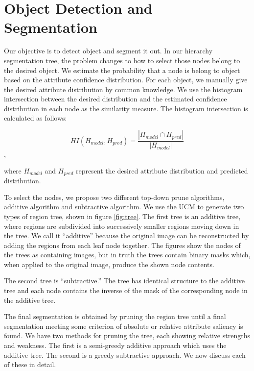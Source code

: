 \documentclass[10pt,twocolumn,letterpaper]{article}
\begin{document}
\section{Object Detection and Segmentation}
\label{sec:detection}

Our objective is to detect object and segment it out. In our
hierarchy segmentation tree, the problem changes to how to select
those nodes belong to the desired object. We estimate the
probability that a node is belong to object based on the attribute
confidence distribution. For each object, we manually give the
desired attribute distribution by common knowledge. We use the
histogram intersection between the desired distribution and the
estimated confidence distribution in each node as the similarity
measure. The histogram intersection is calculated as follows:

\[ HI(H_{model},H_{pred}) = \frac{|H_{model} \cap H_{pred}|}{|H_{model}|}
\] ,

where $H_{model}$ and $H_{pred}$ represent the desired attribute
distribution and predicted distribution.

To select the nodes, we propose two different top-down prune algorithms, additive algorithm and subtractive algorithm. We use the UCM to generate two types of region tree, shown in figure \ref{fig:tree}.
The first tree is an additive tree, where regions are subdivided into successively
smaller regions moving down in the tree.  We call it ``additive'' because the
original image can be reconstructed by adding the regions from each leaf node
together.  The figures show the nodes of the trees as containing images, but in
truth the trees contain binary masks which, when applied to the original image,
produce the shown node contents.

The second tree is ``subtractive.''  The tree has identical structure to the additive
tree and each node contains the inverse of the mask of the corresponding node
in the additive tree.

The final segmentation is obtained by pruning the region tree until a final segmentation
meeting some criterion of absolute or relative attribute saliency is found.
We have two methods for pruning the tree, each showing relative strengths and
weakness.  The first is a semi-greedy additive approach which uses the additive
tree.  The second is a greedy subtractive approach.  We now discuss each of these
in detail.
\end{document}
